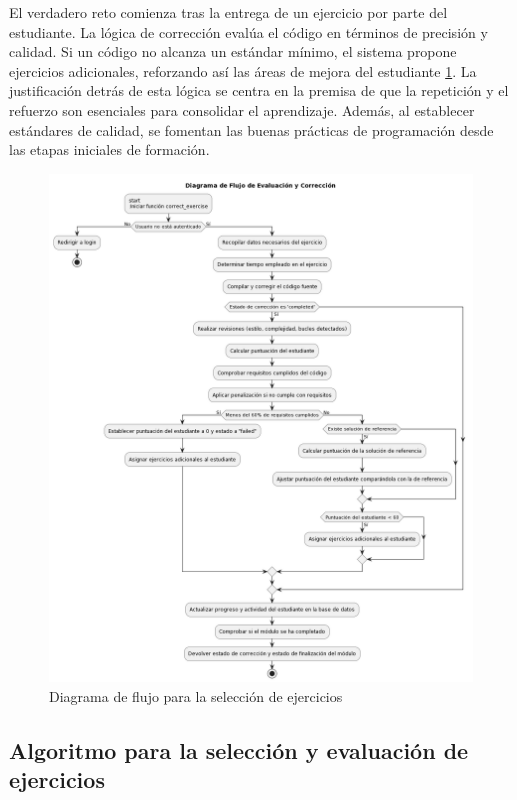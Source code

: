 El verdadero reto comienza tras la entrega de un ejercicio por parte del estudiante. La lógica de corrección evalúa el código en términos de precisión y calidad. Si un código no alcanza un estándar mínimo, el sistema propone ejercicios adicionales, reforzando así las áreas de mejora del estudiante \ref{fig:correccion}. La justificación detrás de esta lógica se centra en la premisa de que la repetición y el refuerzo son esenciales para consolidar el aprendizaje. Además, al establecer estándares de calidad, se fomentan las buenas prácticas de programación desde las etapas iniciales de formación.

\begin{figure}[H]
    \centering
    \includegraphics[width=\textwidth]{imagenes/correcionejercicios.png}
    \caption{Diagrama de flujo para la selección de ejercicios}
    \label{fig:correccion}
    \end{figure}

\subsection{Algoritmo para la selección y evaluación de ejercicios}

